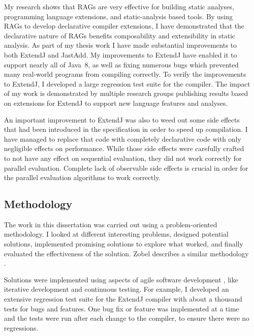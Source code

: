 \documentclass[10pt, twoside, openright]{book}
\begin{document}
My research shows that RAGs are very effective for building static analyses, programming
language extensions,
and static-analysis based tools.
By using RAGs to develop declarative compiler extensions, I have demonstrated that the declarative
nature of RAGs benefits composability and extensibility in static analysis.
As part of my thesis work I have made substantial improvements to both ExtendJ and JastAdd.
My improvements to ExtendJ have enabled it to support nearly all of Java~8,
as well as fixing numerous bugs which prevented many real-world programs from compiling correctly.
To verify the improvements to ExtendJ, I developed a large regression test suite for the compiler.
The impact of my work is demonstrated by multiple research groups publishing results based
on extensions for ExtendJ to support new language features and analyses.


An important improvement to ExtendJ was also to weed out some side effects that had been introduced
in the specification in order to speed up compilation. I have managed to replace that code with
completely declarative code with only negligible effects on performance. While those side effects were
carefully crafted to not have any effect on sequential evaluation, they did not work correctly for
parallel evaluation. Complete lack of observable side effects is crucial in order for the parallel
evaluation algorithms to work correctly.

\subsection{Methodology}

The work in this dissertation was carried out using a problem-oriented methodology. I looked at
different interesting problems, designed potential solutions, implemented promising solutions to
explore what worked, and finally evaluated the effectiveness of the solution.
Zobel describes a similar methodology \cite[p.~54]{zobel2004writing}.

Solutions were implemented using aspects of agile software development
\cite{martin2002agile}, like iterative development and continuous testing. For
example, I developed an extensive regression test suite for the ExtendJ
compiler with about a thousand tests for bugs and features. One bug fix or feature
was implemented at a time and the tests were run after each change to the
compiler, to ensure there were no regressions.
\end{document}
